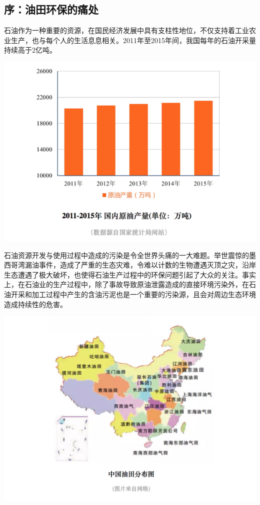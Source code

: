 \documentclass[]{book}
\begin{document}
\hypertarget{ux5e8fux6cb9ux7530ux73afux4fddux7684ux75dbux5904}{%
\subsection{序：油田环保的痛处}\label{ux5e8fux6cb9ux7530ux73afux4fddux7684ux75dbux5904}}

石油作为一种重要的资源，在国民经济发展中具有支柱性地位，不仅支持着工业农业生产，也与每个人的生活息息相关。2011年至2015年间，我国每年的石油开采量持续高于2亿吨。

\includegraphics[width=8.33in]{images/youni1}

石油资源开发与使用过程中造成的污染是令全世界头痛的一大难题。举世震惊的墨西哥湾漏油事件，造成了严重的生态灾难，令难以计数的生物遭遇灭顶之灾，沿岸生态遭遇了极大破坏，也使得石油生产过程中的环保问题引起了大众的关注。事实上，在石油业的生产过程中，除了事故导致原油泄露造成的直接环境污染外，在石油开采和加工过程中产生的含油污泥也是一个重要的污染源，且会对周边生态环境造成持续性的危害。

\includegraphics[width=8.33in]{images/youni2}
\end{document}
